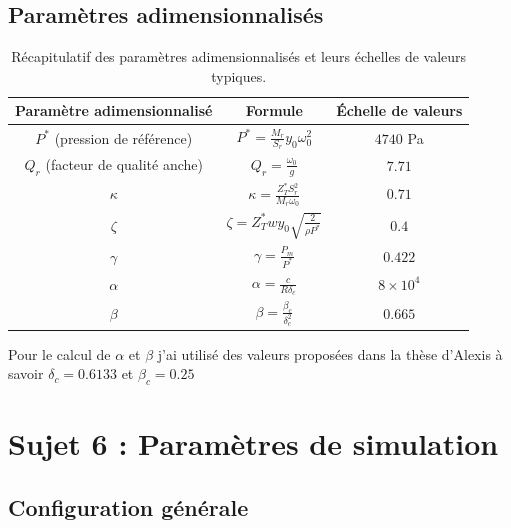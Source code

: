 \documentclass[12pt,a4paper]{article}
\begin{document}
\subsection{Paramètres adimensionnalisés}

\begin{table}[h!]
    \centering
    \begin{tabular}{|c|c|c|}
        \hline
        \textbf{Paramètre adimensionnalisé} & \textbf{Formule} & \textbf{Échelle de valeurs} \\
        \hline
        $P^\ast$ (pression de référence) & $P^\ast = \frac{M_r}{S_r}y_0\omega_0^2$ & $4740$ Pa \\
        \hline
        $Q_r$ (facteur de qualité anche) & $Q_r = \frac{\omega_0}{g}$ & $7.71$ \\
        \hline
        $\kappa$ & $\kappa = \frac{Z_T^\ast S_r^2}{M_r \omega_0}$ & $0.71$ \\
        \hline
        $\zeta$ & $\zeta = Z_T^\ast w y_0 \sqrt{\frac{2}{\rho P^\ast}}$ & $0.4$ \\
        \hline
        $\gamma$ & $\gamma = \frac{P_m}{P^\ast}$ & $0.422$ \\
        \hline
        $\alpha$ & $\alpha = \frac{c}{R \delta_c}$ & $8 \times 10^4$ \\
        \hline
        $\beta$ & $\beta = \frac{\beta_c}{\delta_c^2}$ & $0.665$ \\
        \hline
    \end{tabular}
    \caption{Récapitulatif des paramètres adimensionnalisés et leurs échelles de valeurs typiques.}
\end{table}

Pour le calcul de $\alpha$ et $\beta$ j'ai utilisé des valeurs proposées dans la thèse d'Alexis 
à savoir $\delta_c = 0.6133$ et $\beta_c = 0.25$



\newpage
\section{Sujet 6 : Paramètres de simulation}

\subsection{Configuration générale}
\end{document}
